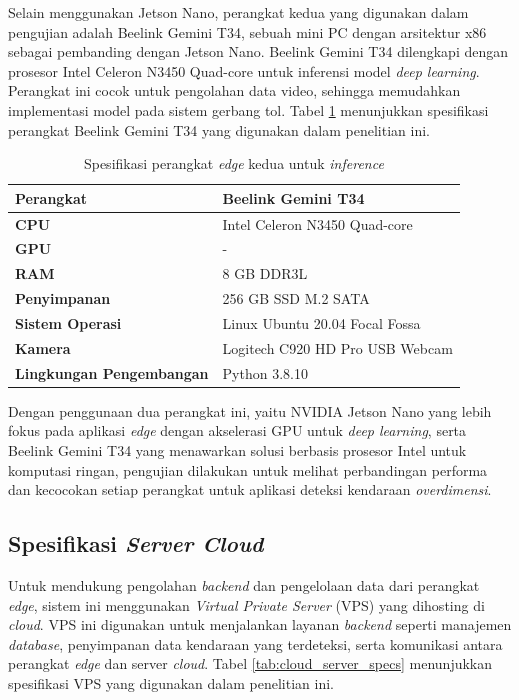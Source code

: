 Selain menggunakan Jetson Nano, perangkat kedua yang digunakan dalam pengujian adalah Beelink Gemini T34, sebuah mini PC dengan arsitektur x86 sebagai pembanding dengan Jetson Nano. Beelink Gemini T34 dilengkapi dengan prosesor Intel Celeron N3450 Quad-core untuk inferensi model \emph{deep learning}. Perangkat ini cocok untuk pengolahan data video, sehingga memudahkan implementasi model pada sistem gerbang tol. Tabel \ref{tab:beelink_t34_specs} menunjukkan spesifikasi perangkat Beelink Gemini T34 yang digunakan dalam penelitian ini.

\begin{table}[htbp]
  \centering
  \caption{Spesifikasi perangkat \emph{edge} kedua untuk \emph{inference}}
  \label{tab:beelink_t34_specs}
  \begin{tabular}{|l|l|}
  \hline
  \textbf{Perangkat} & Beelink Gemini T34 \\
  \hline
  \textbf{CPU} & Intel Celeron N3450 Quad-core \\
  \hline
  \textbf{GPU} & - \\
  \hline
  \textbf{RAM} & 8 GB DDR3L \\
  \hline
  \textbf{Penyimpanan} & 256 GB SSD M.2 SATA \\
  \hline
  \textbf{Sistem Operasi} & Linux Ubuntu 20.04 Focal Fossa \\
  \hline
  \textbf{Kamera} & Logitech C920 HD Pro USB Webcam \\
  \hline
  \textbf{Lingkungan Pengembangan} & Python 3.8.10 \\
  \hline
  \end{tabular}
\end{table}

Dengan penggunaan dua perangkat ini, yaitu NVIDIA Jetson Nano yang lebih fokus pada aplikasi \emph{edge} dengan akselerasi GPU untuk \emph{deep learning}, serta Beelink Gemini T34 yang menawarkan solusi berbasis prosesor Intel untuk komputasi ringan, pengujian dilakukan untuk melihat perbandingan performa dan kecocokan setiap perangkat untuk aplikasi deteksi kendaraan \emph{overdimensi}.

\subsection{Spesifikasi \emph{Server Cloud}}

Untuk mendukung pengolahan \emph{backend} dan pengelolaan data dari perangkat \emph{edge}, sistem ini menggunakan \emph{Virtual Private Server} (VPS) yang dihosting di \emph{cloud}. VPS ini digunakan untuk menjalankan layanan \emph{backend} seperti manajemen \emph{database}, penyimpanan data kendaraan yang terdeteksi, serta komunikasi antara perangkat \emph{edge} dan server \emph{cloud}. Tabel \ref{tab:cloud_server_specs} menunjukkan spesifikasi VPS yang digunakan dalam penelitian ini.

